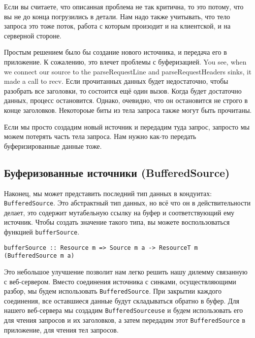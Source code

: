 Если вы считаете, что описанная проблема не так критична, то это потому, что вы не до конца погрузились в детали. Нам надо также учитывать, что тело запроса это тоже поток,
работа с которым произодит и на клиентской, и на серверной стороне.

Простым решением было бы создание нового источника, и передача его в приложение.
К сожалению, это влечет проблемы с буферизацией. You
see, when we connect our source to the parseRequestLine and
parseRequestHeaders sinks, it made a call to recv. 
Если прочитанных данных будет недостаточно, чтобы разобрать все заголовки, то 
состоится ещё один вызов. Когда будет достаточно данных, процесс остановится. 
Однако, очевидно, что он остановится не строго в конце заголовков. Некотороые 
биты из тела запроса также могут быть прочитаны.

Если мы просто создадим новый источник и передадим туда запрос, запросто мы можем 
потерять часть тела запроса. Нам нужно как-то передать буферизированные данные 
тоже.

\subsection{Буферизованные источники (BufferedSource)}
Наконец, мы может представить последний тип данных в кондуитах: 
\lstinline'BufferedSource'. Это абстрактный тип данных, но всё что он в 
действительности делает, это содержит мутабельную ссылку на буфер и 
соответствующий ему источник. Чтобы создать значение такого типа, вы можете 
воспользоваться функцией \lstinline'bufferSource'.
\begin{verbatim}
bufferSource :: Resource m => Source m a -> ResourceT m (BufferedSource m a)
\end{verbatim}
Это небольшое улучшение позволит нам легко решить нашу дилемму связанную с 
веб-сервером. Вместо соединения источника с синками, осуществляющими разбор, 
мы будем использовать \lstinline'BufferedSource'. При закрытии каждого 
соединения, все оставшиеся данные будут складываться обратно в буфер. 
Для нашего веб-сервера мы создадим \lstinline'BufferedSourceuse' и будем 
использовать его для чтения запросов и их заголовков, а затем передадим этот 
\lstinline'BufferedSource' в приложение, для чтения тел запросов.

